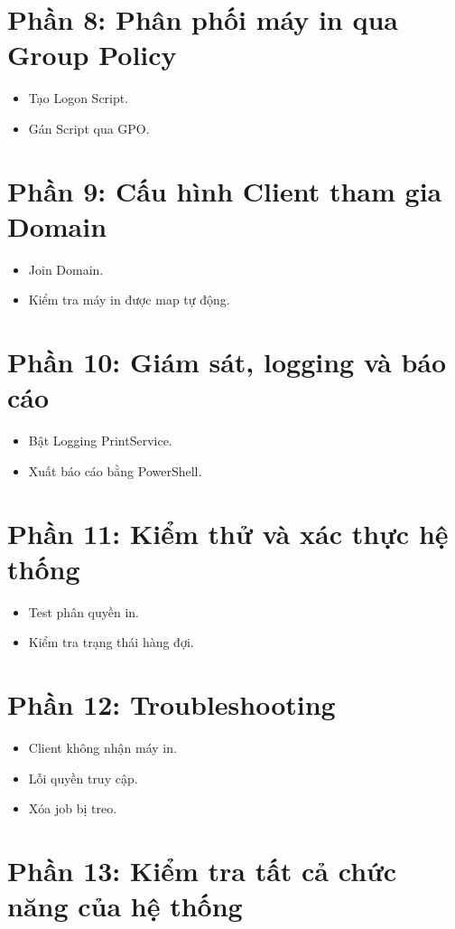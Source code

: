 \section*{Phần 8: Phân phối máy in qua Group Policy}
\begin{itemize}
    \item Tạo Logon Script.
    \item Gán Script qua GPO.
\end{itemize}

\section*{Phần 9: Cấu hình Client tham gia Domain}
\begin{itemize}
    \item Join Domain.
    \item Kiểm tra máy in được map tự động.
\end{itemize}

\section*{Phần 10: Giám sát, logging và báo cáo}
\begin{itemize}
    \item Bật Logging PrintService.
    \item Xuất báo cáo bằng PowerShell.
\end{itemize}

\section*{Phần 11: Kiểm thử và xác thực hệ thống}
\begin{itemize}
    \item Test phân quyền in.
    \item Kiểm tra trạng thái hàng đợi.
\end{itemize}

\section*{Phần 12: Troubleshooting}
\begin{itemize}
    \item Client không nhận máy in.
    \item Lỗi quyền truy cập.
    \item Xóa job bị treo.
\end{itemize}
\section*{Phần 13: Kiểm tra tất cả chức năng của hệ thống}
